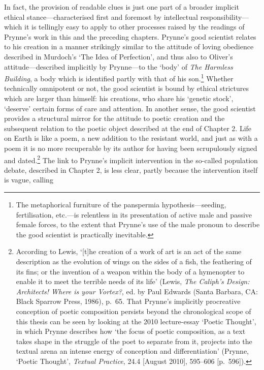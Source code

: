 \documentclass[]{article}
\begin{document}
In fact, the provision of readable clues is just one part of a broader
implicit ethical stance—characterised first and foremost by intellectual
responsibility—which it is tellingly easy to apply to other processes
raised by the readings of Prynne’s work in this and the preceding
chapters. Prynne’s good scientist relates to his creation in a manner
strikingly similar to the attitude of loving obedience described in
Murdoch’s ‘The Idea of Perfection’, and thus also to Oliver’s
attitude—described implicitly by Prynne—to the ‘body’ of \emph{The
Harmless Building}, a body which is identified partly with that of his
son.\footnote{The metaphorical furniture of the panspermia
  hypothesis—seeding, fertilisation, etc.—is relentless in its
  presentation of active male and passive female forces, to the extent
  that Prynne’s use of the male pronoun to describe the good scientist
  is practically inevitable.} Whether technically omnipotent or not, the
good scientist is bound by ethical strictures which are larger than
himself: his creations, who share his ‘genetic stock’, ‘deserve’ certain
forms of care and attention. In another sense, the good scientist
provides a structural mirror for the attitude to poetic creation and the
subsequent relation to the poetic object described at the end of Chapter
2. Life on Earth is like a poem, a new addition to the resistant world,
and just as with a poem it is no more recuperable by its author for
having been scrupulously signed and dated.\footnote{According to Lewis,
  ‘{[}t{]}he creation of a work of art is an act of the same description
  as the evolution of wings on the sides of a fish, the feathering of
  its fins; or the invention of a weapon within the body of a hymenopter
  to enable it to meet the terrible needs of its life’ (Lewis, \emph{The
  Caliph’s Design: Architects! Where is your Vortex?}, ed. by Paul
  Edwards (Santa Barbara, CA: Black Sparrow Press, 1986), p.~65. That
  Prynne’s implicitly procreative conception of poetic composition
  persists beyond the chronological scope of this thesis can be seen by
  looking at the 2010 lecture-essay ‘Poetic Thought’, in which Prynne
  describes how ‘the focus of poetic composition, as a text takes shape
  in the struggle of the poet to separate from it, projects into the
  textual arena an intense energy of conception and differentiation’
  (Prynne, ‘Poetic Thought’, \emph{Textual Practice}, 24.4 {[}August
  2010{]}, 595–606 {[}p.~596{]}).} The link to Prynne’s implicit
intervention in the so-called population debate, described in Chapter 2,
is less clear, partly because the intervention itself is vague, calling
\end{document}
